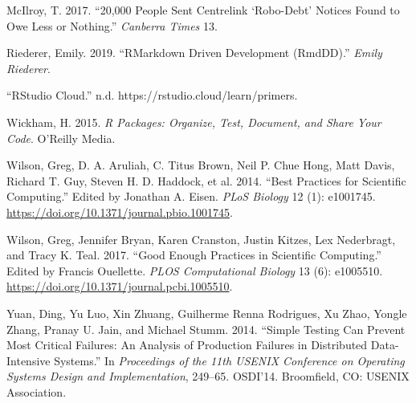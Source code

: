 \documentclass[
]{article}
\newlength{\cslhangindent}
\newenvironment{cslreferences}%
  {\setlength{\parindent}{0pt}%
  \everypar{\setlength{\hangindent}{\cslhangindent}}\ignorespaces}%
  {\par}
\begin{document}
\begin{cslreferences}
\leavevmode\hypertarget{ref-mcilroy201720}{}%
McIlroy, T. 2017. ``20,000 People Sent Centrelink `Robo-Debt' Notices
Found to Owe Less or Nothing.'' \emph{Canberra Times} 13.

\leavevmode\hypertarget{ref-riederer_rmarkdowndrivendevelopment_2019}{}%
Riederer, Emily. 2019. ``RMarkdown Driven Development (RmdDD).''
\emph{Emily Riederer}.

\leavevmode\hypertarget{ref-_rstudiocloud_}{}%
``RStudio Cloud.'' n.d. https://rstudio.cloud/learn/primers.

\leavevmode\hypertarget{ref-wickham_r_2015}{}%
Wickham, H. 2015. \emph{R Packages: Organize, Test, Document, and Share
Your Code}. O'Reilly Media.

\leavevmode\hypertarget{ref-wilson_best_2014}{}%
Wilson, Greg, D. A. Aruliah, C. Titus Brown, Neil P. Chue Hong, Matt
Davis, Richard T. Guy, Steven H. D. Haddock, et al. 2014. ``Best
Practices for Scientific Computing.'' Edited by Jonathan A. Eisen.
\emph{PLoS Biology} 12 (1): e1001745.
\url{https://doi.org/10.1371/journal.pbio.1001745}.

\leavevmode\hypertarget{ref-wilson_good_2017}{}%
Wilson, Greg, Jennifer Bryan, Karen Cranston, Justin Kitzes, Lex
Nederbragt, and Tracy K. Teal. 2017. ``Good Enough Practices in
Scientific Computing.'' Edited by Francis Ouellette. \emph{PLOS
Computational Biology} 13 (6): e1005510.
\url{https://doi.org/10.1371/journal.pcbi.1005510}.

\leavevmode\hypertarget{ref-yuan_simpletestingcan_2014}{}%
Yuan, Ding, Yu Luo, Xin Zhuang, Guilherme Renna Rodrigues, Xu Zhao,
Yongle Zhang, Pranay U. Jain, and Michael Stumm. 2014. ``Simple Testing
Can Prevent Most Critical Failures: An Analysis of Production Failures
in Distributed Data-Intensive Systems.'' In \emph{Proceedings of the
11th USENIX Conference on Operating Systems Design and Implementation},
249--65. OSDI'14. Broomfield, CO: USENIX Association.
\end{cslreferences}
\end{document}
